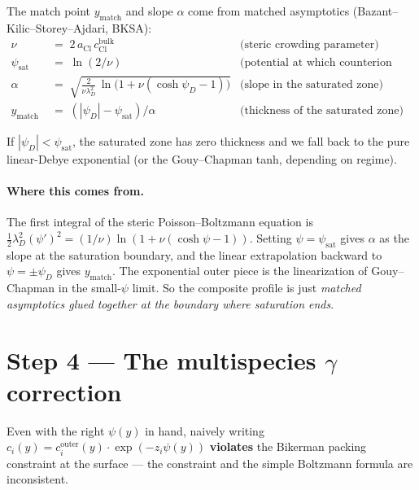 \documentclass[11pt]{article}
\newcommand{\lD}{\lambda_D}
\begin{document}
The match point $y_{\mathrm{match}}$ and slope $\alpha$ come from
matched asymptotics (Bazant--Kilic--Storey--Ajdari, BKSA):
\begin{align}
  \nu &\;=\; 2\,a_{\mathrm{Cl}}\,c_{\mathrm{Cl}}^{\mathrm{bulk}}
        & \text{(steric crowding parameter)} \\
  \psi_{\mathrm{sat}} &\;=\; \ln(2/\nu)
        & \text{(potential at which counterion close-packs)} \\
  \alpha &\;=\; \sqrt{\frac{2}{\nu \lD^2}\,
                       \ln\!\bigl(1 + \nu(\cosh\psi_D - 1)\bigr)}
        & \text{(slope in the saturated zone)} \\
  y_{\mathrm{match}} &\;=\; (|\psi_D| - \psi_{\mathrm{sat}})/\alpha
        & \text{(thickness of the saturated zone)}
\end{align}

If $|\psi_D| < \psi_{\mathrm{sat}}$, the saturated zone has zero
thickness and we fall back to the pure linear-Debye exponential
(or the Gouy--Chapman tanh, depending on regime).

\paragraph{Where this comes from.} The first integral of the
steric Poisson--Boltzmann equation is
$\frac{1}{2} \lD^2 (\psi')^2 = (1/\nu) \ln(1 + \nu(\cosh\psi - 1))$.
Setting $\psi = \psi_{\mathrm{sat}}$ gives $\alpha$ as the slope at
the saturation boundary, and the linear extrapolation backward to
$\psi = \pm \psi_D$ gives $y_{\mathrm{match}}$. The exponential outer
piece is the linearization of Gouy--Chapman in the small-$\psi$
limit. So the composite profile is just \emph{matched asymptotics
glued together at the boundary where saturation ends}.

\section{Step 4 --- The multispecies $\gamma$ correction}

Even with the right $\psi(y)$ in hand, naively writing
$c_i(y) = c_i^{\mathrm{outer}}(y) \cdot \exp(-z_i \psi(y))$
\textbf{violates} the Bikerman packing constraint at the surface --- the
constraint and the simple Boltzmann formula are inconsistent.
\end{document}
